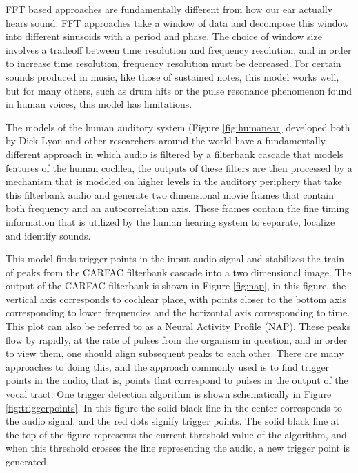 \documentclass[12pt,oneside]{book}
\begin{document}
FFT based approaches are fundamentally different from how our ear
actually hears sound.  FFT approaches take a window of data and
decompose this window into different sinusoids with a period and
phase.  The choice of window size involves a tradeoff between time
resolution and frequency resolution, and in order to increase time
resolution, frequency resolution must be decreased.  For certain
sounds produced in music, like those of sustained notes, this model
works well, but for many others, such as drum hits or the pulse
resonance phenomenon found in human voices, this model has
limitations.

The models of the human auditory system (Figure \ref{fig:humanear}
developed both by Dick Lyon \cite{slaney93} and other researchers
around the world have a fundamentally different approach in which
audio is filtered by a filterbank cascade that models features of the
human cochlea, the outputs of these filters are then processed by a
mechanism that is modeled on higher levels in the auditory periphery
that take this filterbank audio and generate two dimensional movie
frames that contain both frequency and an autocorrelation axis.  These
frames contain the fine timing information that is utilized by the
human hearing system to separate, localize and identify sounds.

This model finds trigger points in the input audio signal and
stabilizes the train of peaks from the CARFAC filterbank cascade into
a two dimensional image.  The output of the CARFAC filterbank is shown
in Figure \ref{fig:nap}, in this figure, the vertical axis corresponds
to cochlear place, with points closer to the bottom axis corresponding
to lower frequencies and the horizontal axis corresponding to time.
This plot can also be referred to as a Neural Activity Profile (NAP).
These peaks flow by rapidly, at the rate of pulses from the organism
in question, and in order to view them, one should align subsequent
peaks to each other.  There are many approaches to doing this, and the
approach commonly used is to find trigger points in the audio, that
is, points that correspond to pulses in the output of the vocal tract.
One trigger detection algorithm is shown schematically in Figure
\ref{fig:triggerpoints}.  In this figure the solid black line in the
center corresponds to the audio signal, and the red dots signify
trigger points.  The solid black line at the top of the figure
represents the current threshold value of the algorithm, and when this
threshold crosses the line representing the audio, a new trigger point
is generated.
\end{document}
